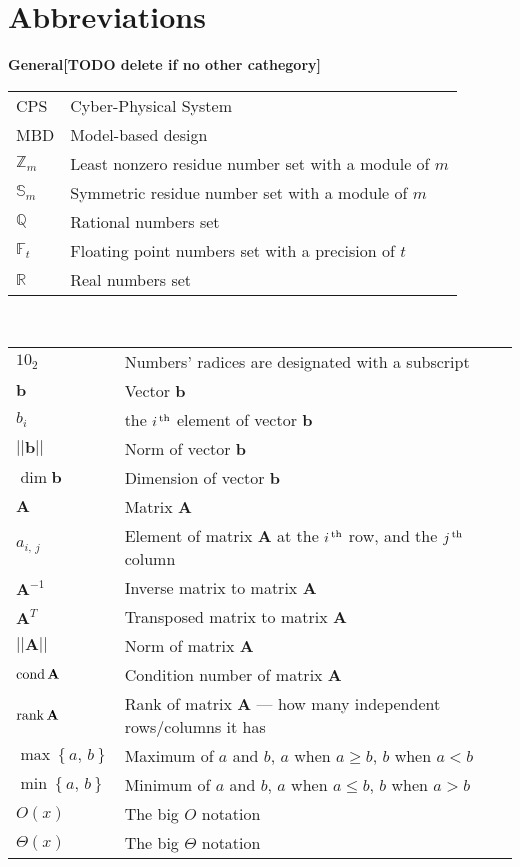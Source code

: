 \chapter*{Abbreviations}

{\bf General[TODO delete if no other cathegory]}\\

\begin{tabular}{ll}
CPS & Cyber-Physical System\\
MBD & Model-based design\\
{$\mathbb Z_m$} & Least nonzero residue number set with a module of $m$\\
{$\mathbb S_m$} & Symmetric residue number set with a module of $m$\\
{$\mathbb Q$} & Rational numbers set\\
{$\mathbb F_t$} & Floating point numbers set with a precision of $t$\\
{$\mathbb R$} & Real numbers set
\end{tabular}
\vskip 1cm

\\

\begin{tabular}{ll}
$10_2$ & Numbers' radices are designated with a subscript \\
${\mathbf b}$ & Vector $\mathbf b$\\
$b_{i}$ & the $i^{\,{\rm th}}$ element of vector $\mathbf b$\\
${||\mathbf b||}$ & Norm of vector $\mathbf b$\\
$\dim \mathbf b$ & Dimension of vector $\mathbf b$\\
${\mathbf A}$ & Matrix $\mathbf A$\\
$a_{i,\,j}$ & Element of matrix $\mathbf A$ at the $i^{\,{\rm th}}$ row, and the $j^{\,{\rm th}}$ column\\
${\mathbf A^{-1}}$ & Inverse matrix to matrix $\mathbf A$\\
${\mathbf A^T}$ & Transposed matrix to matrix $\mathbf A$\\
${||\mathbf A||}$ & Norm of matrix $\mathbf A$\\
$\mathop{\mathrm{cond}}\nolimits \mathbf A$ & Condition number of matrix $\mathbf A$\\
$\mathop{\mathrm{rank}}\nolimits \mathbf A$ & Rank of matrix $\mathbf A$ --- how many independent rows/columns it has\\
$\max\left\{a,\,b\right\}$ & Maximum of $a$ and $b$, $a$ when $a\geq b$, $b$ when $a<b$\\
$\min\left\{a,\,b\right\}$ & Minimum of $a$ and $b$, $a$ when $a\leq b$, $b$ when $a>b$\\
$O(x)$ & The big $O$ notation\\
$\Theta(x)$ & The big $\Theta$ notation\\
\end{tabular}
\newpage

